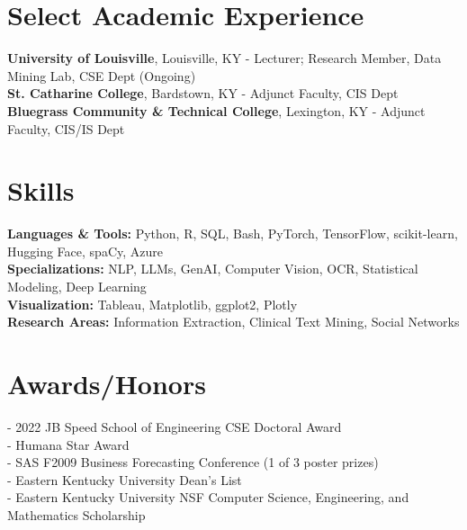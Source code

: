 \documentclass[a4paper,10pt]{article}
\begin{document}
\section*{Select Academic Experience}
\noindent
\textbf{University of Louisville}, Louisville, KY - Lecturer; Research Member, Data Mining Lab, CSE Dept (Ongoing)\\
\textbf{St. Catharine College}, Bardstown, KY - Adjunct Faculty, CIS Dept\\
\textbf{Bluegrass Community \& Technical College}, Lexington, KY - Adjunct Faculty, CIS/IS Dept

\section*{Skills}
\noindent
\textbf{Languages \& Tools:} Python, R, SQL, Bash, PyTorch, TensorFlow, scikit-learn, Hugging Face, spaCy, Azure\\
\textbf{Specializations:} NLP, LLMs, GenAI, Computer Vision, OCR, Statistical Modeling, Deep Learning\\
\textbf{Visualization:} Tableau, Matplotlib, ggplot2, Plotly\\
\textbf{Research Areas:} Information Extraction, Clinical Text Mining, Social Networks

\section*{Awards/Honors}
\noindent - 2022 JB Speed School of Engineering CSE Doctoral Award\\ %
- Humana Star Award\\
- SAS F2009 Business Forecasting Conference (1 of 3 poster prizes)\\
- Eastern Kentucky University Dean's List\\
- Eastern Kentucky University NSF Computer Science, Engineering, and Mathematics Scholarship
\end{document}
